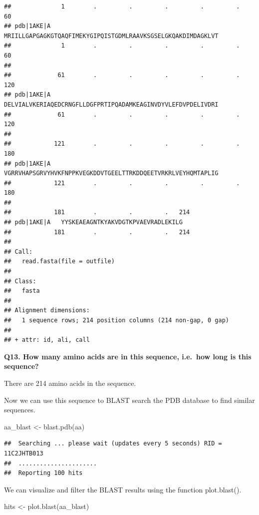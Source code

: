 \documentclass[
]{article}
\newenvironment{Shaded}{\begin{snugshade}}{\end{snugshade}}
\newcommand{\FunctionTok}[1]{\textcolor[rgb]{0.00,0.00,0.00}{#1}}
\newcommand{\NormalTok}[1]{#1}
\newcommand{\OtherTok}[1]{\textcolor[rgb]{0.56,0.35,0.01}{#1}}
\begin{document}
\begin{verbatim}
##              1        .         .         .         .         .         60 
## pdb|1AKE|A   MRIILLGAPGAGKGTQAQFIMEKYGIPQISTGDMLRAAVKSGSELGKQAKDIMDAGKLVT
##              1        .         .         .         .         .         60 
## 
##             61        .         .         .         .         .         120 
## pdb|1AKE|A   DELVIALVKERIAQEDCRNGFLLDGFPRTIPQADAMKEAGINVDYVLEFDVPDELIVDRI
##             61        .         .         .         .         .         120 
## 
##            121        .         .         .         .         .         180 
## pdb|1AKE|A   VGRRVHAPSGRVYHVKFNPPKVEGKDDVTGEELTTRKDDQEETVRKRLVEYHQMTAPLIG
##            121        .         .         .         .         .         180 
## 
##            181        .         .         .   214 
## pdb|1AKE|A   YYSKEAEAGNTKYAKVDGTKPVAEVRADLEKILG
##            181        .         .         .   214 
## 
## Call:
##   read.fasta(file = outfile)
## 
## Class:
##   fasta
## 
## Alignment dimensions:
##   1 sequence rows; 214 position columns (214 non-gap, 0 gap) 
## 
## + attr: id, ali, call
\end{verbatim}

\textbf{Q13. How many amino acids are in this sequence, i.e.~how long is
this sequence?}

There are 214 amino acids in the sequence.

Now we can use this sequence to BLAST search the PDB database to find
similar sequences.

\begin{Shaded}
\begin{Highlighting}[]
\NormalTok{aa\_blast }\OtherTok{\textless{}{-}} \FunctionTok{blast.pdb}\NormalTok{(aa)}
\end{Highlighting}
\end{Shaded}

\begin{verbatim}
##  Searching ... please wait (updates every 5 seconds) RID = 11C2JHTB013 
##  ......................
##  Reporting 100 hits
\end{verbatim}

We can visualize and filter the BLAST results using the function
plot.blast().

\begin{Shaded}
\begin{Highlighting}[]
\NormalTok{hits }\OtherTok{\textless{}{-}} \FunctionTok{plot.blast}\NormalTok{(aa\_blast)}
\end{Highlighting}
\end{Shaded}
\end{document}
